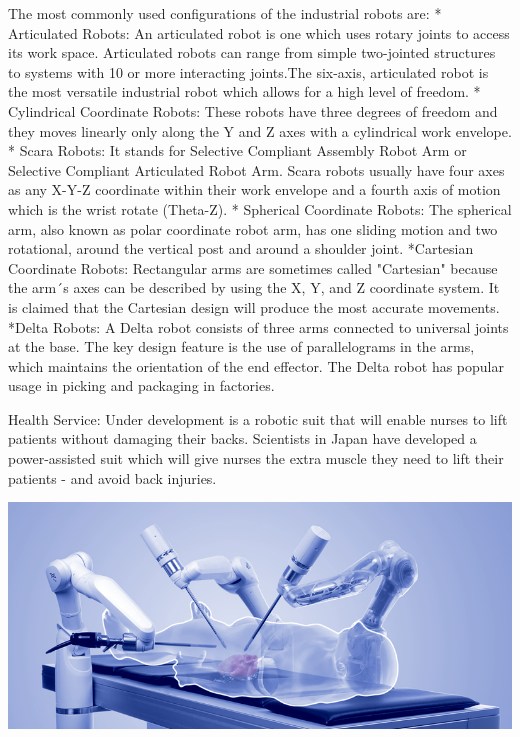 \documentclass{fisatproject}
\begin{document}
The most commonly used configurations of the industrial robots are:\newline\newline
* Articulated Robots: An articulated robot is one which uses rotary joints to access its work space.  Articulated robots can range from simple two-jointed structures to systems with 10 or more interacting joints.The six-axis, articulated robot is the most versatile industrial robot which allows for a high level of freedom.\newline\newline
* Cylindrical Coordinate Robots: These robots have three degrees of freedom and they moves linearly only along the Y and Z axes with a cylindrical work envelope.\newline\newline
* Scara Robots: It stands for Selective Compliant Assembly Robot Arm or Selective Compliant Articulated Robot Arm. Scara robots usually have four axes as any X-Y-Z coordinate within their work envelope and a fourth axis of motion which is the wrist rotate (Theta-Z).\newline\newline
* Spherical Coordinate Robots: The spherical arm, also known as polar coordinate robot arm, has one sliding motion and two rotational, around the vertical post and around a shoulder joint.\newline\newline
*Cartesian Coordinate Robots: Rectangular arms are sometimes called "Cartesian" because the arm´s axes can be described by using the X, Y, and Z coordinate system. It is claimed that the Cartesian design will produce the most accurate movements.\newline\newline
*Delta Robots: A Delta robot consists of three arms connected to universal joints at the base. The key design feature is the use of parallelograms in the arms, which maintains the orientation of the end effector. The Delta robot has popular usage in picking and packaging in factories.\cite{b}

\vspace{1cm}
Health Service: Under development is a robotic suit that will enable nurses to lift patients without damaging their backs. Scientists in Japan have developed a power-assisted suit which will give nurses the extra muscle they need to lift their patients - and avoid back injuries.\cite{c}

\begin{center}
\includegraphics[scale=.5]{heal.png}
\end{center}
\end{document}
